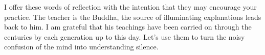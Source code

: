 I offer these words of reflection with the intention that they may
encourage your practice. The teacher is the Buddha, the source of
illuminating explanations leads back to him. I am grateful that his
teachings have been carried on through the centuries by each generation
up to this day. Let's use them to turn the noisy confusion of the mind
into understanding silence.
